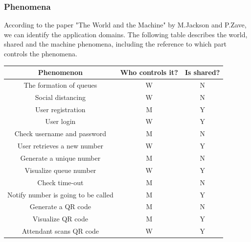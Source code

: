 \documentclass[table, 12pt]{article}
\begin{document}
\begin{flushleft}
    \subsubsection{Phenomena}
    According to the paper "The World and the Machine" by M.Jackson and P.Zave, we can identify the application domains. The following table describes the world, shared and the machine phenomena, including the reference to which part controls the phenomena.
    \begin{center}
        \begin{table}
            \begin{tabularx}{\textwidth}{| c| c| c|}
                \hline
                \rowcolor{blue!50}
                Phenomenon                                 & Who controls it? & Is shared? \\
                \hline
                The formation of queues                    & W                & N          \\
                Social distancing                          & W                & N          \\
                User registration                          & M                & Y          \\
                User login                                 & W                & Y          \\
                Check username and password                & M                & N          \\
                User retrieves a new number                & W                & Y          \\
                Generate a unique number                   & M                & N          \\
                Visualize queue number                     & W                & Y          \\
                Check time-out                             & M                & N          \\
                Notify number is going to be called        & M                & Y          \\
                Generate a QR code                         & M                & N          \\
                Visualize QR code                          & M                & Y          \\
                Attendant scans QR code                    & W                & Y          \\

\end{tabularx}
\end{table}
\end{center}
\end{flushleft}
\end{document}
